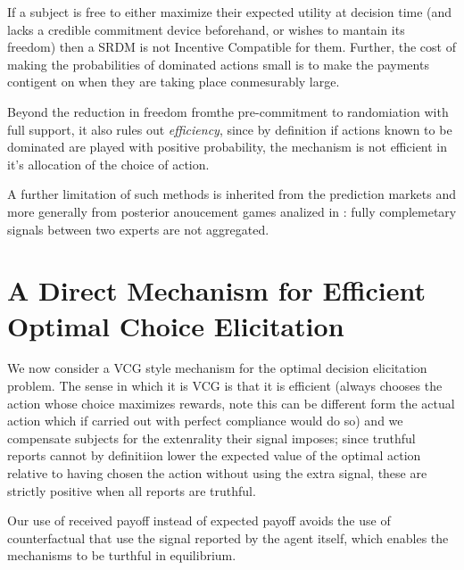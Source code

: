 If a subject is free to either maximize their expected utility at decision time (and lacks a credible commitment device beforehand, or wishes to mantain its freedom) then a SRDM is not Incentive Compatible for them. Further, the cost of making the probabilities of dominated actions small is to make the payments contigent on when they are taking place conmesurably large.

Beyond the reduction in freedom fromthe pre-commitment to randomiation with full support, it also rules out \emph{efficiency}, since by definition if actions known to be dominated are played with positive probability, the mechanism is not efficient in it's allocation of the choice of action. 

A further limitation of such methods is inherited from the prediction markets and more generally from posterior anoucement games analized in \cite{ostrovsky2012information}: fully complemetary signals between two experts are not aggregated. 

\section{A Direct Mechanism for Efficient Optimal Choice Elicitation}

We now consider a VCG style mechanism for the optimal decision elicitation problem. The sense in which it is VCG is that it is efficient (always chooses the action whose choice maximizes rewards, note this can be different form the actual action which if carried out with perfect compliance would do so) and we compensate subjects for the extenrality their signal imposes; since truthful reports cannot by definitiion lower the expected value of the optimal action relative to having chosen the action without using the extra signal, these are strictly positive when all reports are truthful. 

Our use of received payoff instead of expected payoff avoids the use of counterfactual that use the signal reported by the agent itself, which enables the mechanisms to be turthful in equilibrium.

